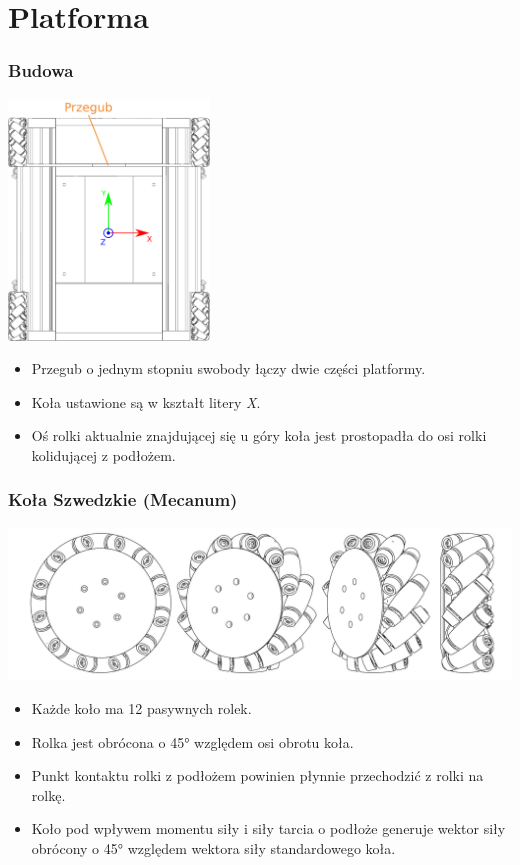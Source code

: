 \documentclass{beamer}
\begin{document}
	\section{Platforma}
	\begin{frame}
		\frametitle{Budowa}
		\centering
		\includegraphics[width=0.4\textwidth]{graphics/base.pdf}
		\begin{itemize}
			\item Przegub o jednym stopniu swobody łączy dwie części platformy.
			\item Koła ustawione są w kształt litery \emph{X}.
			\item Oś rolki aktualnie znajdującej się u góry koła jest prostopadła do osi rolki kolidującej z podłożem.
		\end{itemize}
	\end{frame}

	\begin{frame}
		\frametitle{Koła Szwedzkie (Mecanum)}
		\centering
		\includegraphics[width=\textwidth]{graphics/wheel.pdf}
		\begin{itemize}
			\item Każde koło ma 12 pasywnych rolek.
			\item Rolka jest obrócona o 45° względem osi obrotu koła.
			\item Punkt kontaktu rolki z podłożem powinien płynnie przechodzić z rolki na rolkę.
			\item Koło pod wpływem momentu siły i siły tarcia o podłoże generuje wektor siły obrócony o 45° względem wektora siły standardowego koła.
		\end{itemize}
	\end{frame}
	
\end{document}
